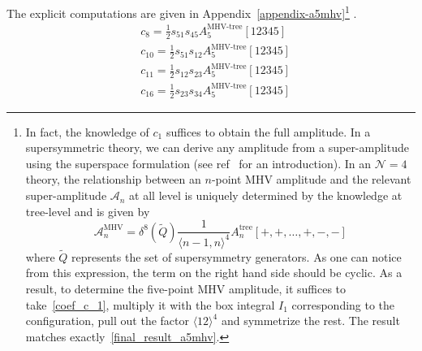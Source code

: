 The explicit computations are given in Appendix~\ref{appendix-a5mhv}\footnote{
In fact, the knowledge of $c_1$ suffices to obtain the full amplitude.
In a supersymmetric theory, we can derive any amplitude from a super-amplitude using the superspace formulation (see \eg ref~\cite{Elvang:2013cua} for an introduction). 
In an $\mathcal{N} = 4$ theory, the relationship between an $n$-point MHV amplitude and the relevant super-amplitude $\mathcal{A}_n$ at all level is uniquely determined by the knowledge at tree-level and is given by~\cite{Elvang:2010xn} 
\begin{equation}
\mathcal{A}_n^{\mathrm{MHV}} = \delta^{8}(\tilde{Q})\frac{1}{\langle n-1, n\rangle^4}A_n^{\mathrm{tree}}[+,+,\ldots,+,-,-]
\end{equation}
where $\tilde{Q}$ represents the set of supersymmetry generators.
As one can notice from this expression, the term on the right hand side should be cyclic. 
As a result, to determine the five-point MHV amplitude, it suffices to take~\cref{coef_c_1}, multiply it with the box integral $I_1$ corresponding to the configuration, pull out the factor $\langle 12 \rangle^4$ and symmetrize the rest.
The result matches exactly~\cref{final_result_a5mhv}.
}
.
\begin{equation}
\begin{split}
& c_8 = \frac{1}{2} s_{51}s_{45} A_5^{\textrm{MHV-tree}}[12345]
\\
& c_{10} = \frac{1}{2}s_{51}s_{12}A_5^{\textrm{MHV-tree}}[12345]
\\
& c_{11} = \frac{1}{2}s_{12}s_{23}A_5^{\textrm{MHV-tree}}[12345]
\\
& c_{16}= \frac{1}{2}s_{23}s_{34}A_5^{\textrm{MHV-tree}}[12345]
\end{split}
\end{equation}
%
%
\iffalse

